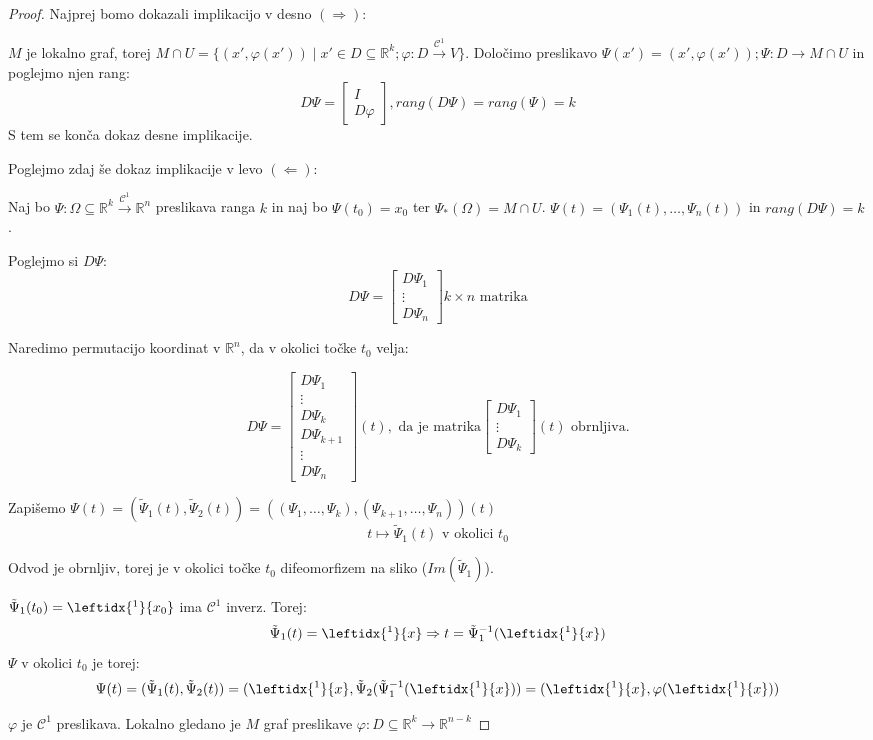 \documentclass[a4paper, 10pt]{article}
\newcommand{\mth}[1]{\ensuremath{\mathbb{#1}}}
\newcommand{\R}{\mth{R}}
\newcommand{\con}{\ensuremath{\mathscr{C}}}
\begin{document}
\begin{proof}
Najprej bomo dokazali implikacijo v desno $(\Rightarrow)$:

$M$ je lokalno graf, torej $M \cap U = \{ (x',\varphi(x')) \mid x' \in D \subseteq \R^k; \varphi: D \xrightarrow{\con^1} V\}$.
Določimo preslikavo $\Psi(x') = (x', \varphi(x')); \Psi: D \rightarrow M \cap U$ in poglejmo njen rang:
\[
D\Psi = \begin{bmatrix}
I \\
D\varphi
\end{bmatrix}
, rang(D\Psi) = rang(\Psi) = k
\]
S tem se konča dokaz desne implikacije.

Poglejmo zdaj še dokaz implikacije v levo $(\Leftarrow)$:

Naj bo $\Psi: \Omega \subseteq \R^k \xrightarrow{\con^1} \R^n$ preslikava ranga $k$ in naj bo $\Psi(t_0) = x_0$ ter $\Psi_{\ast}(\Omega) = M \cap U$. $\Psi(t) = (\Psi_1(t), \ldots, \Psi_n(t))$ in $rang(D\Psi) = k$.

Poglejmo si $D\Psi$:
\[
D\Psi = \begin{bmatrix}
D\Psi_1 \\
\vdots \\
D\Psi_n
\end{bmatrix}
k \times n \text{~matrika}
\]

Naredimo permutacijo koordinat v $\R^n$, da v okolici točke $t_0$ velja:

\[
D\Psi = \begin{bmatrix}
D\Psi_1 \\
\vdots \\
D\Psi_k \\
D\Psi_{k + 1} \\
\vdots \\
D\Psi_n
\end{bmatrix}(t)
, \text{~da je matrika} \begin{bmatrix}
D\Psi_1 \\
\vdots \\
D\Psi_k
\end{bmatrix}(t)
\text{~obrnljiva.}
\]

Zapišemo $\Psi(t) = (\tilde{\Psi}_1(t), \tilde{\Psi}_2(t)) = ((\Psi_1, \ldots, \Psi_k), (\Psi_{k + 1}, \ldots, \Psi_n))(t)$
\[
t \mapsto \tilde{\Psi}_1(t) \text{~v okolici~} t_0
\]

Odvod je obrnljiv, torej je v okolici točke $t_0$ difeomorfizem na sliko ($Im(\tilde{\Psi}_1)$).

$\tilde{\Psi}_1(t_0)=\leftidx{^1}{x_0}$ ima $\con^1$ inverz. Torej:
\[
\tilde{\Psi}_1(t) = \leftidx{^1}{x} \Rightarrow t = \tilde{\Psi}^{-1}_1(\leftidx{^1}{x})
\]
$\Psi$ v okolici $t_0$ je torej:
\[
\Psi(t) = (\tilde{\Psi}_1(t), \tilde{\Psi}_2(t)) = (\leftidx{^1}{x}, \tilde{\Psi}_2(\tilde{\Psi}^{-1}_1(\leftidx{^1}{x})) = (\leftidx{^1}{x}, \varphi(\leftidx{^1}{x}))
\]

$\varphi$ je $\con^1$ preslikava. Lokalno gledano je $M$ graf preslikave $\varphi: D \subseteq \R^k \rightarrow \R^{n - k}$

\end{proof}
\end{document}
